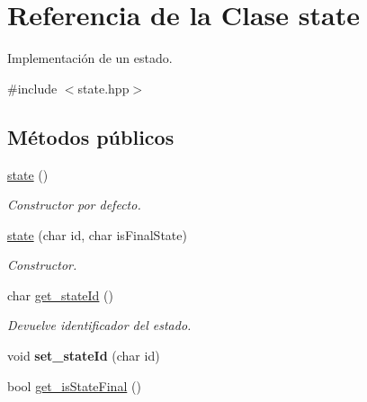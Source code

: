 \hypertarget{classstate}{}\section{Referencia de la Clase state}
\label{classstate}


Implementación de un estado.  




{\ttfamily \#include $<$state.\+hpp$>$}

\subsection*{Métodos públicos}
\begin{DoxyCompactItemize}
\item 
\mbox{\label{classstate_aee920d9f534640451f22b3525f9cb9de}} 
\mbox{\hyperlink{classstate_aee920d9f534640451f22b3525f9cb9de}{state}} ()
\begin{DoxyCompactList}\small\item\em Constructor por defecto. \end{DoxyCompactList}\item 
\mbox{\label{classstate_a812734a4f547d491a5687ba90d136127}} 
\mbox{\hyperlink{classstate_a812734a4f547d491a5687ba90d136127}{state}} (char id, char is\+Final\+State)
\begin{DoxyCompactList}\small\item\em Constructor. \end{DoxyCompactList}\item 
\mbox{\label{classstate_a864ef817493becc7064268d2a8e39a9a}} 
char \mbox{\hyperlink{classstate_a864ef817493becc7064268d2a8e39a9a}{get\+\_\+state\+Id}} ()
\begin{DoxyCompactList}\small\item\em Devuelve identificador del estado. \end{DoxyCompactList}\item 
\mbox{\label{classstate_a7c2963978efe6e239a192c22755bb5c7}} 
void {\bfseries set\+\_\+state\+Id} (char id)
\item 
\mbox{\label{classstate_a45d2639356a8b7ca910ab9aebee13e7a}} 
bool \mbox{\hyperlink{classstate_a45d2639356a8b7ca910ab9aebee13e7a}{get\+\_\+is\+State\+Final}} ()

\end{DoxyCompactItemize}
